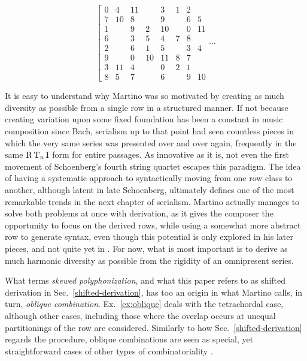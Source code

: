 \begin{example}
    \begin{equation}
    	\left[
    	\begin{array}{cc|cc|cc|cc|}
        	0 & 4 & 11 && 3 & 1 & 2 & \\
        	7 & 10 & 8 && 9 && 6 & 5 \\
        	1 && 9 & 2 & 10 && 0 & 11 \\
        	6 && 3 & 5 & 4 & 7 & 8 & \\
        	2 && 6 & 1 & 5 && 3 & 4 \\
        	9 && 0 & 10 & 11 & 8 & 7 & \\
        	3 & 11 & 4 && 0 & 2 & 1 & \\
        	8 & 5 & 7 && 6 && 9 & 10
    	\end{array}
    	\right. \cdots
	\end{equation}
\end{example}

It is easy to understand why Martino was so motivated by creating as much diversity as possible from a single row in a structured manner. If not because creating variation upon some fixed foundation has been a constant in music composition since Bach, serialism up to that point had seen countless pieces in which the very same series was presented over and over again, frequently in the same $\operatorname{R}\operatorname{T}_n\operatorname{I}$ form for entire passages. As innovative as it is, not even the first movement of Schoenberg's fourth string quartet escapes this paradigm. The idea of having a systematic approach to syntactically moving from one row class to another, although latent in late Schoenberg, ultimately defines one of the most remarkable trends in the next chapter of serialism. Martino actually manages to solve both problems at once with derivation, as it gives the composer the opportunity to focus on the derived rows, while using a somewhat more abstract row to generate syntax, even though this potential is only explored in his later pieces, and not quite yet in \cite{Martino1961}. For now, what is most important is to derive as much harmonic diversity as possible from the rigidity of an omnipresent series.

What \cite{Starr1984} terms \emph{skewed polyphonization}, and what this paper refers to as shifted derivation in Sec.~\ref{shifted-derivation}, has too an origin in what Martino calls, in turn, \emph{oblique combination}. Ex.~\ref{ex:oblique} deals with the tetrachordal case, although other cases, including those where the overlap occurs at unequal partitionings of the row are considered. Similarly to how Sec.~\ref{shifted-derivation} regards the procedure, oblique combinations are seen as special, yet straightforward cases of other types of combinatoriality \cite[267]{Martino1961}.

